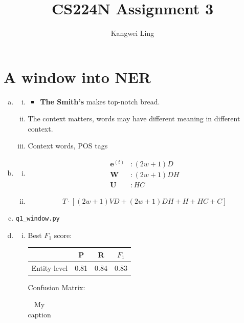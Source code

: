 \documentclass{article}[11pt]
\title{CS224N Assignment 3}
\author{Kangwei Ling}
\newcommand{\bW} { \bm{W} }
\newcommand{\bU} { \bm{U} }
\newcommand{\be} { \bm{e}}
\newcommand{\bet}[1][t]{ \be^{(#1)}}
\begin{document}
\maketitle

\section{A window into NER}

\begin{enumerate}[(a)]
\item
  \begin{enumerate}[i.]
  \item
    \begin{itemize}
    \item \textbf{The Smith's} makes top-notch bread.
    \end{itemize}
  \item The context matters, words may have different meaning in different
    context.
  \item Context words, POS tags
  \end{enumerate}
\item
  \begin{enumerate}[i.]
  \item 
  \begin{align*}
    \bet &: (2w+1)D \\
    \bW  &: (2w+1)DH \\
    \bU  &: HC
  \end{align*}
\item \[T \cdot [(2w+1)VD +  (2w+1)DH + H + HC + C]\]
  \end{enumerate}
\item \verb|q1_window.py|
\item
  \begin{enumerate}[i.]
  \item Best $F_1$ score:
    \begin{table}[H]
      \centering
      \begin{tabular}{c|c|c|c}
        &P&R&$F_1$ \\ \hline \hline
        Entity-level & 0.81 & 0.84 & 0.83 \\ \hline
      \end{tabular}
    \end{table}
    Confusion Matrix:
    \begin{table}[H]
      \centering
      \caption{My caption}
      \label{my-label}
      \begin{tabular}{|c|c|c|c|c|c|}
        \hline

\end{tabular}
\end{table}
\end{enumerate}
\end{enumerate}
\end{document}
